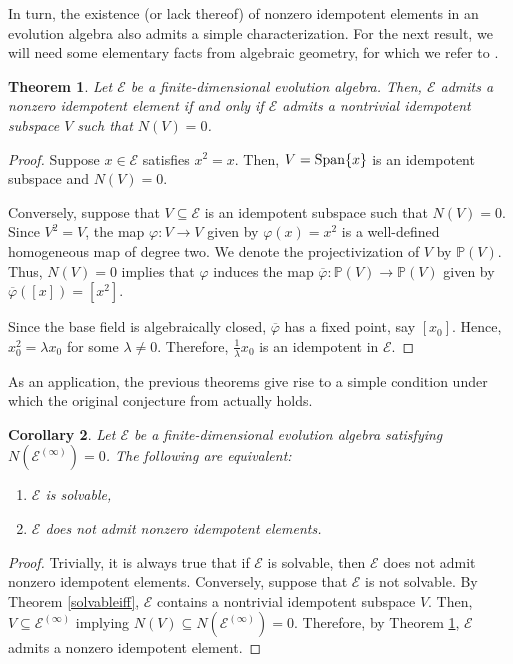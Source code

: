 \documentclass[11pt]{article}
\newtheorem{thm}{Theorem}[section]
\newtheorem{cor}[thm]{Corollary}
\theoremstyle{definition}
\numberwithin{equation}{section}
\begin{document}
\begin{aiblock}
In turn, the existence (or lack thereof) of nonzero idempotent elements in an evolution algebra also admits a simple characterization. For the next result, we will need some elementary facts from algebraic geometry, for which we refer to \cite{Harris}.


\begin{thm}\label{idempotentiff}
    Let $\mathcal E$ be a finite-dimensional evolution algebra. Then, $\mathcal E$ admits a nonzero idempotent element if and only if $\mathcal E$ admits a nontrivial idempotent subspace $V$ such that $N(V) = 0$. 
\end{thm}
\begin{proof}
    Suppose $x\in \mathcal E$ satisfies $x^2 = x$. Then, $V=\operatorname{Span}\{x\}$ is an idempotent subspace and $N(V) = 0$.  

    Conversely, suppose that $V\subseteq \mathcal E$ is an idempotent subspace such that $N(V)=0$.  Since $V^2 = V$, the map $\varphi:V\to V$ given by $\varphi(x) = x^2$ is a well-defined homogeneous map of degree two. We denote the projectivization of $V$ by $\mathbb{P}(V)$. Thus, $N(V) = 0$ implies that $\varphi$ induces the map $\overline{\varphi}:\mathbb P(V)\to \mathbb P(V)$ given by $\overline{\varphi}([x]) = [x^2]$.

    Since the base field is algebraically closed, $\overline{\varphi}$ has a fixed point, say $[x_0]$. Hence, $x_0^2 =\lambda x_0$ for some $\lambda \neq 0$. Therefore, $\frac{1}{\lambda} x_0$ is an idempotent in $\mathcal E$. 
\end{proof}


As an application, the previous theorems give rise to a simple condition under which the original conjecture from \cite{GP26} actually holds. 


\begin{cor}\label{thecorollary}
 Let $\mathcal E$ be a finite-dimensional evolution algebra satisfying $N(\mathcal E^{(\infty)}) = 0$. 
 The following are equivalent: 

 \begin{enumerate}
     \item $\mathcal E$ is solvable,
     \item $\mathcal E$ does not admit nonzero idempotent elements.
 \end{enumerate}

 
\end{cor}
\begin{proof}
    Trivially, it is always true that if $\mathcal E$ is solvable, then $\mathcal E$ does not admit nonzero idempotent elements. Conversely, suppose that $\mathcal E$ is not solvable. By Theorem \ref{solvableiff}, $\mathcal E$ contains a nontrivial idempotent subspace $V$. Then, $V\subseteq \mathcal E^{(\infty)}$ implying $N(V) \subseteq N(\mathcal E^{(\infty)}) = 0$. Therefore, by Theorem \ref{idempotentiff},  $\mathcal E$ admits a nonzero idempotent element.
\end{proof}

\end{aiblock}
\end{document}
